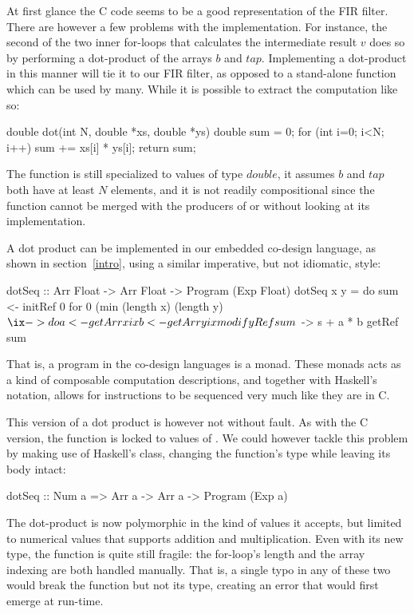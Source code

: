 \documentclass[../paper.tex]{subfiles}
\begin{document}
At first glance the C code seems to be a good representation of the FIR filter. There are however a few problems with the implementation. For instance, the second of the two inner for-loops that calculates the intermediate result $v$ does so by performing a dot-product of the arrays $b$ and $tap$. Implementing a dot-product in this manner will tie it to our FIR filter, as opposed to a stand-alone function which can be used by many. While it is possible to extract the computation like so:

\begin{code}
double dot(int N, double *xs, double *ys) {
  double sum = 0;
  for (int i=0; i<N; i++) sum += xs[i] * ys[i];
  return sum;
}
\end{code}

\noindent The function is still specialized to values of type $double$, it assumes $b$ and $tap$ both have at least $N$ elements, and it is not readily compositional since the function cannot be merged with the producers of  or  without looking at its implementation.

A dot product can be implemented in our embedded co-design language, as shown in section~\ref{intro}, using a similar imperative, but not idiomatic, style:

\begin{code}
dotSeq :: Arr Float -> Arr Float -> Program (Exp Float)
dotSeq x y = do
  sum <- initRef 0
  for 0 (min (length x) (length y) $ \ix -> do
    a <- getArr x ix
    b <- getArr y ix
    modifyRef sum $ \s -> s + a * b
  getRef sum
\end{code}

\noindent That is, a program in the co-design languages is a monad. These monads acts as a kind of composable computation descriptions, and together with Haskell's  notation, allows for instructions to be sequenced very much like they are in C.

This version of a dot product is however not without fault. As with the C version, the function is locked to values of . We could however tackle this problem by making use of Haskell's  class, changing the function's type while leaving its body intact:

\begin{code}
dotSeq :: Num a => Arr a -> Arr a -> Program (Exp a)
\end{code}

The dot-product is now polymorphic in the kind of values it accepts, but limited to numerical values that supports addition and multiplication. Even with its new type, the function is quite still fragile: the for-loop's length and the array indexing are both handled manually. That is, a single typo in any of these two would break the function but not its type, creating an error that would first emerge at run-time.
\end{document}
